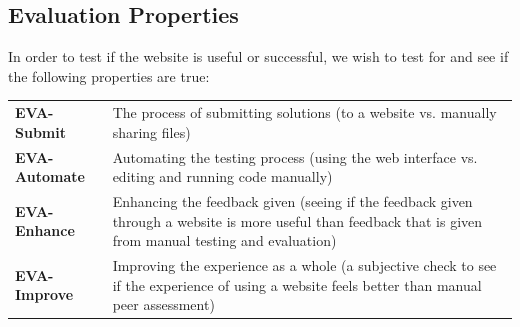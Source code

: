 \documentclass[a4paper,11pt]{report}
\begin{document}
\subsection{Evaluation Properties}
In order to test if the website is useful or successful, we wish to test for and see if the following properties are true:\\
\begin{tabularx}{\textwidth}{lX}
 \textbf{EVA-Submit} & The process of submitting solutions (to a website vs. manually sharing files)\\
 \textbf{EVA-Automate} & Automating the testing process (using the web interface vs. editing and running code manually)\\
 \textbf{EVA-Enhance} & Enhancing the feedback given (seeing if the feedback given through a website is more useful than feedback that is given from manual testing and evaluation)\\
 \textbf{EVA-Improve} & Improving the experience as a whole (a subjective check to see if the experience of using a website feels better than manual peer assessment)\\
\end{tabularx}
\end{document}
